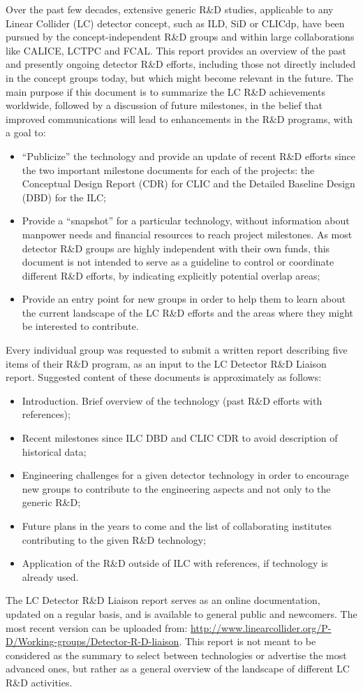 \documentclass[10pt,final]{report}
\begin{document}
Over the past few decades, extensive generic R\&D studies, applicable to any Linear Collider (LC) detector concept, such as ILD, SiD or CLICdp, have been pursued by the concept-independent R\&D groups and within large collaborations like CALICE, LCTPC and FCAL. This report provides an overview of the past and presently ongoing detector R\&D efforts, including those not directly included in the concept groups today, but which might become relevant in the future. The main purpose if this document is to summarize the LC R\&D achievements worldwide, followed by a discussion of future milestones, in the belief that improved communications will lead to enhancements in the R\&D programs, with a goal to:
\begin{itemize}
\item “Publicize” the technology and provide an update of recent R\&D efforts since the two important milestone documents for each of the projects: the Conceptual Design Report (CDR) for CLIC and the Detailed Baseline Design (DBD) for the ILC;
\item Provide a “snapshot” for a particular technology, without information about manpower needs and financial resources to reach project milestones. As most detector R\&D groups are highly independent with their own funds, this document is not intended to serve as a guideline to control or coordinate different R\&D efforts, by indicating explicitly potential overlap areas;
\item Provide an entry point for new groups in order to help them to learn about the current landscape of the LC R\&D efforts and the areas where they might be interested to contribute.
\end{itemize}
Every individual group was requested to submit a written report describing five items of their R\&D program, as an input to the LC Detector R\&D Liaison report. Suggested content of these documents is approximately as follows:
\begin{itemize}
\item Introduction. Brief overview of the technology (past R\&D efforts with references);
\item Recent milestones since ILC DBD and CLIC CDR to avoid description of historical data;
\item Engineering challenges for a given detector technology in order to encourage new groups to contribute to the engineering aspects and not only to the generic R\&D;
\item Future plans in the years to come and the list of collaborating institutes contributing to the given R\&D technology;
\item Application of the R\&D outside of ILC with references, if technology is already used.
\end{itemize}
The LC Detector R\&D Liaison report serves as an online documentation, updated on a regular basis, and is available to general public and newcomers. The most recent version can be uploaded from: \url{http://www.linearcollider.org/P-D/Working-groups/Detector-R-D-liaison}. This report is not meant to be considered as the summary to select between technologies or advertise the most advanced ones, but rather as a general overview of the landscape of different LC R\&D activities. 
\end{document}
